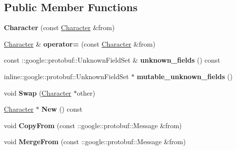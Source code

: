 \subsection*{Public Member Functions}
\begin{DoxyCompactItemize}
\item 
{\bfseries Character} (const \hyperlink{classCharacter}{Character} \&from)\hypertarget{classCharacter_a8f5bf8d77951e0ea45b39462a7546cdf}{}\label{classCharacter_a8f5bf8d77951e0ea45b39462a7546cdf}

\item 
\hyperlink{classCharacter}{Character} \& {\bfseries operator=} (const \hyperlink{classCharacter}{Character} \&from)\hypertarget{classCharacter_aab229e15048a97ef8ff087125ccaadcf}{}\label{classCharacter_aab229e15048a97ef8ff087125ccaadcf}

\item 
const \+::google\+::protobuf\+::\+Unknown\+Field\+Set \& {\bfseries unknown\+\_\+fields} () const \hypertarget{classCharacter_a579a66025abb75ec9020de5cf981b4cb}{}\label{classCharacter_a579a66025abb75ec9020de5cf981b4cb}

\item 
inline\+::google\+::protobuf\+::\+Unknown\+Field\+Set $\ast$ {\bfseries mutable\+\_\+unknown\+\_\+fields} ()\hypertarget{classCharacter_a9885e1f3fa422149a1fc6936616df9e1}{}\label{classCharacter_a9885e1f3fa422149a1fc6936616df9e1}

\item 
void {\bfseries Swap} (\hyperlink{classCharacter}{Character} $\ast$other)\hypertarget{classCharacter_ae439e522739760c54ef9d65acd53615e}{}\label{classCharacter_ae439e522739760c54ef9d65acd53615e}

\item 
\hyperlink{classCharacter}{Character} $\ast$ {\bfseries New} () const \hypertarget{classCharacter_af1c934cc12cbef7ddcf73bf7197cd3db}{}\label{classCharacter_af1c934cc12cbef7ddcf73bf7197cd3db}

\item 
void {\bfseries Copy\+From} (const \+::google\+::protobuf\+::\+Message \&from)\hypertarget{classCharacter_aa0496b0a8682360a40607c8f5b092875}{}\label{classCharacter_aa0496b0a8682360a40607c8f5b092875}

\item 
void {\bfseries Merge\+From} (const \+::google\+::protobuf\+::\+Message \&from)\hypertarget{classCharacter_a88ccb78cc0e4e17cb9287278cd4f6ed5}{}\label{classCharacter_a88ccb78cc0e4e17cb9287278cd4f6ed5}


\end{DoxyCompactItemize}

